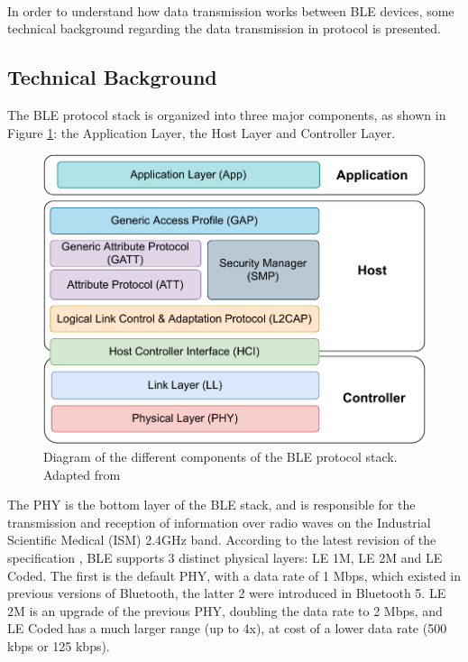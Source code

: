 \paragraph{} In order to understand how data transmission works between \acs{BLE} devices, some technical background regarding the data transmission in protocol is presented.

\subsection{Technical Background} 

The \acs{BLE} protocol stack is organized into three major components, as shown in Figure \ref{fig:ble-protocol-stack}: the Application Layer, the Host Layer and Controller Layer. 

\begin{figure}[H]
    \centering
    \includegraphics[width=0.6\linewidth]{images/ble protocol stack.pdf}
    \caption[Diagram of the different components of the \acs{BLE} protocol stack.]{Diagram of the different components of the \acs{BLE} protocol stack. Adapted from \cite{Specification1999, Farej2020}}
    \label{fig:ble-protocol-stack}
\end{figure}

The \acf{PHY} is the bottom layer of the \acs{BLE} stack, and is responsible for the transmission and reception of information over radio waves on the Industrial Scientific Medical (ISM) 2.4GHz band. According to the latest revision of the specification \cite{Specification1999}, \acs{BLE} supports 3 distinct physical layers: LE 1M, LE 2M and LE Coded. The first is the default \acs{PHY}, with a data rate of 1 Mbps, which existed in previous versions of Bluetooth, the latter 2 were introduced in Bluetooth 5. LE 2M is an upgrade of the previous \acs{PHY}, doubling the data rate to 2 Mbps, and LE Coded has a much larger range (up to 4x), at cost of a lower data rate (500 kbps or 125 kbps). 

